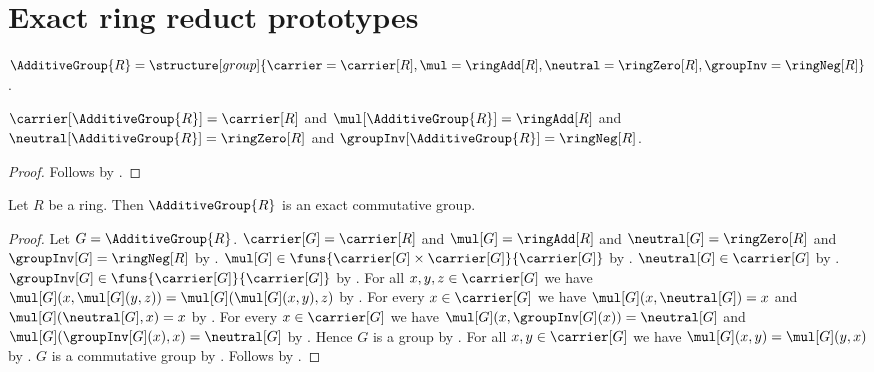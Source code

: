 


\section{Exact ring reduct prototypes}

\begin{definition}\label{spike_additive_group}
    $\AdditiveGroup{R}=
        \structure[group]{
            \carrier=\carrier[R],
            \mul=\ringAdd[R],
            \neutral=\ringZero[R],
            \groupInv=\ringNeg[R]
        }$.
\end{definition}

\begin{proposition}\label{spike_additive_group_fields}
    $\carrier[\AdditiveGroup{R}]=\carrier[R]$ and
    $\mul[\AdditiveGroup{R}]=\ringAdd[R]$ and
    $\neutral[\AdditiveGroup{R}]=\ringZero[R]$ and
    $\groupInv[\AdditiveGroup{R}]=\ringNeg[R]$.
\end{proposition}
\begin{proof}
    Follows by
        .
\end{proof}

\begin{proposition}\label{spike_additive_group_is_exact}
    Let $R$ be a ring.
    Then $\AdditiveGroup{R}$ is an exact commutative group.
\end{proposition}
\begin{proof}
    Let $G=\AdditiveGroup{R}$.
    $\carrier[G]=\carrier[R]$ and $\mul[G]=\ringAdd[R]$ and
        $\neutral[G]=\ringZero[R]$ and
        $\groupInv[G]=\ringNeg[R]$ by
        .
    $\mul[G]\in\funs{\carrier[G]\times\carrier[G]}{\carrier[G]}$ by
        .
    $\neutral[G]\in\carrier[G]$ by .
    $\groupInv[G]\in\funs{\carrier[G]}{\carrier[G]}$ by
        .
    For all $x,y,z\in\carrier[G]$ we have
        $\mul[G](x,\mul[G](y,z))=\mul[G](\mul[G](x,y),z)$ by
        .
    For every $x\in\carrier[G]$ we have
        $\mul[G](x,\neutral[G])=x$ and
        $\mul[G](\neutral[G],x)=x$ by
        .
    For every $x\in\carrier[G]$ we have
        $\mul[G](x,\groupInv[G](x))=\neutral[G]$ and
        $\mul[G](\groupInv[G](x),x)=\neutral[G]$ by
        .
    Hence $G$ is a group by
        .
    For all $x,y\in\carrier[G]$ we have
        $\mul[G](x,y)=\mul[G](y,x)$ by
        .
    $G$ is a commutative group by
        .
    Follows by
        .
\end{proof}

